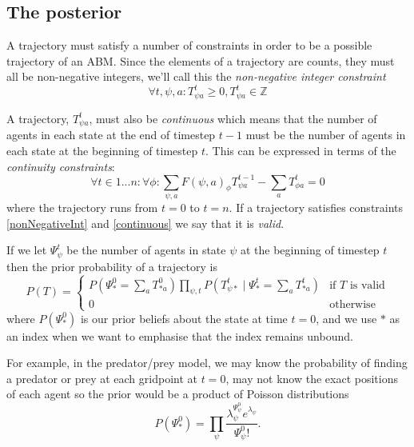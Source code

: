\documentclass{article}
\begin{document}
\subsection{The posterior}
A trajectory must satisfy a number of constraints in order to be a possible trajectory of an ABM. Since the elements of a trajectory are counts, they must all be non-negative integers, we'll call this the \textit{non-negative integer constraint}
\begin{equation}
\forall t,\psi, a: T^t_{\psi a} \ge 0, T^t_{\psi a} \in \mathbb{Z}
\label{nonNegativeInt}
\end{equation}

A trajectory, $T^t_{\psi a}$, must also be \textit{continuous} which means that the number of agents in each state at the end of timestep $t-1$ must be the number of agents in each state at the beginning of timestep $t$. This can be expressed in terms of the \textit{continuity constraints}:
\begin{equation}
\forall t \in 1 ... n:\forall \phi: \sum_{\psi, a} F(\psi, a)_\phi T^{t-1}_{\psi a} - \sum_a T^t_{\phi a} = 0
\label{continuous}
\end{equation}
where the trajectory runs from $t=0$ to $t=n$. If a trajectory satisfies constraints \ref{nonNegativeInt} and \ref{continuous} we say that it is \textit{valid}.

If we let $\Psi^t_\psi$ be the number of agents in state $\psi$ at the beginning of timestep $t$ then the prior probability of a trajectory is
\[
P(T) =
\begin{cases}
P\left(\Psi^0_{*} = \sum_a T^0_{* a}\right) \prod_{\psi, t} P\left(T^t_{\psi *} \mid \Psi^t_* = \sum_a T^t_{* a}\right) & \text{if } T \text{ is valid} \\
0 & \text{otherwise}
\end{cases}
\]
where $P(\Psi^0_*)$ is our prior beliefs about the state at time $t=0$, and we use $*$ as an index when we want to emphasise that the index remains unbound.

For example, in the predator/prey model, we may know the probability of finding a predator or prey at each gridpoint at $t=0$, may not know the exact positions of each agent so the prior would be a product of Poisson distributions
\[
P(\Psi^0_*) = \prod_\psi \frac{\lambda_\psi^{\Psi^0_\psi} e^{\lambda_\psi}}{\Psi^0_\psi!}.
\]
\end{document}
